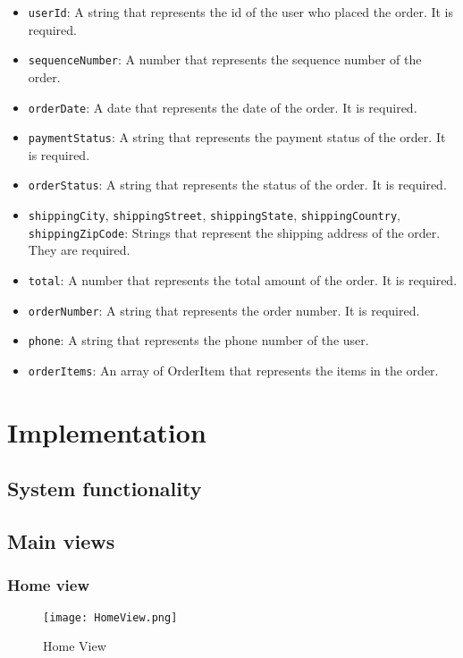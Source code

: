 \begin{itemize}
    \item \texttt{userId}: A string that represents the id of the user who placed the order. It is required.
    \item \texttt{sequenceNumber}: A number that represents the sequence number of the order.
    \item \texttt{orderDate}: A date that represents the date of the order. It is required.
    \item \texttt{paymentStatus}: A string that represents the payment status of the order. It is required.
    \item \texttt{orderStatus}: A string that represents the status of the order. It is required.
    \item \texttt{shippingCity}, \texttt{shippingStreet}, \texttt{shippingState}, \texttt{shippingCountry}, \texttt{shippingZipCode}: Strings that represent the shipping address of the order. They are required.
    \item \texttt{total}: A number that represents the total amount of the order. It is required.
    \item \texttt{orderNumber}: A string that represents the order number. It is required.
    \item \texttt{phone}: A string that represents the phone number of the user.
    \item \texttt{orderItems}: An array of OrderItem that represents the items in the order.
\end{itemize}

\section{Implementation}
\subsection{System functionality}
\subsection[]{Main views}
\subsubsection{Home view}
\begin{figure}[H]
    \texttt{[image: HomeView.png]}
    \caption{Home View}
    \label{fig:HomeView}
\end{figure}

